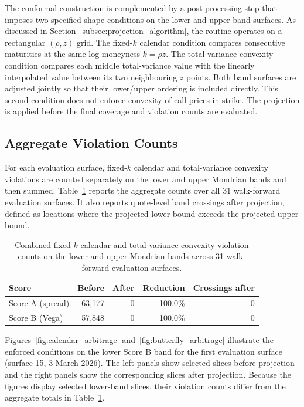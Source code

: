 The conformal construction is complemented by a post-processing step that imposes two specified shape conditions on the lower and upper band surfaces. As discussed in Section~\ref{subsec:projection_algorithm}, the routine operates on a rectangular $(\rho,z)$ grid. The fixed-$k$ calendar condition compares consecutive maturities at the same log-moneyness $k=\rho z$. The total-variance convexity condition compares each middle total-variance value with the linearly interpolated value between its two neighbouring $z$ points. Both band surfaces are adjusted jointly so that their lower/upper ordering is included directly. This second condition does not enforce convexity of call prices in strike. The projection is applied before the final coverage and violation counts are evaluated.

\subsection{Aggregate Violation Counts}
\label{subsec:exp_arb_counts}

For each evaluation surface, fixed-$k$ calendar and total-variance convexity violations are counted separately on the lower and upper Mondrian bands and then summed. Table~\ref{tab:arbitrage} reports the aggregate counts over all 31 walk-forward evaluation surfaces. It also reports quote-level band crossings after projection, defined as locations where the projected lower bound exceeds the projected upper bound.

\begin{table}[H]
\centering
\begin{tabular}{|l|r|r|r|r|}
\hline
\textbf{Score} & \textbf{Before} & \textbf{After} & \textbf{Reduction} & \textbf{Crossings after} \\
\hline
Score A (spread) & 63{,}177 & 0 & 100.0\% & 0 \\
Score B (Vega)   & 57{,}848 & 0 & 100.0\% & 0 \\
\hline
\end{tabular}
\caption{Combined fixed-$k$ calendar and total-variance convexity violation counts on the lower and upper Mondrian bands across 31 walk-forward evaluation surfaces.}
\label{tab:arbitrage}
\end{table}

Figures~\ref{fig:calendar_arbitrage} and~\ref{fig:butterfly_arbitrage} illustrate the enforced conditions on the lower Score B band for the first evaluation surface (surface 15, 3 March 2026). The left panels show selected slices before projection and the right panels show the corresponding slices after projection. Because the figures display selected lower-band slices, their violation counts differ from the aggregate totals in Table~\ref{tab:arbitrage}.

